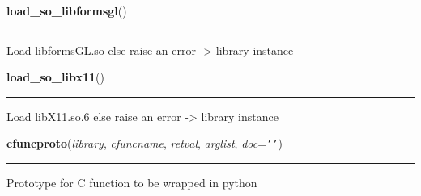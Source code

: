     \label{xformslib:library:load_so_libformsgl}

    \vspace{0.5ex}

\hspace{.8\funcindent}\begin{boxedminipage}{\funcwidth}

    \raggedright \textbf{load\_so\_libformsgl}()

    \vspace{-1.5ex}

    \rule{\textwidth}{0.5\fboxrule}
\setlength{\parskip}{2ex}
    Load libformsGL.so else raise an error -{\textgreater} library instance

\setlength{\parskip}{1ex}
    \end{boxedminipage}

    \label{xformslib:library:load_so_libx11}

    \vspace{0.5ex}

\hspace{.8\funcindent}\begin{boxedminipage}{\funcwidth}

    \raggedright \textbf{load\_so\_libx11}()

    \vspace{-1.5ex}

    \rule{\textwidth}{0.5\fboxrule}
\setlength{\parskip}{2ex}
    Load libX11.so.6 else raise an error -{\textgreater} library instance

\setlength{\parskip}{1ex}
    \end{boxedminipage}

    \label{xformslib:library:cfuncproto}

    \vspace{0.5ex}

\hspace{.8\funcindent}\begin{boxedminipage}{\funcwidth}

    \raggedright \textbf{cfuncproto}(\textit{library}, \textit{cfuncname}, \textit{retval}, \textit{arglist}, \textit{doc}={\tt \texttt{'}\texttt{}\texttt{'}})

    \vspace{-1.5ex}

    \rule{\textwidth}{0.5\fboxrule}
\setlength{\parskip}{2ex}
    Prototype for C function to be wrapped in python

\setlength{\parskip}{1ex}
    \end{boxedminipage}

